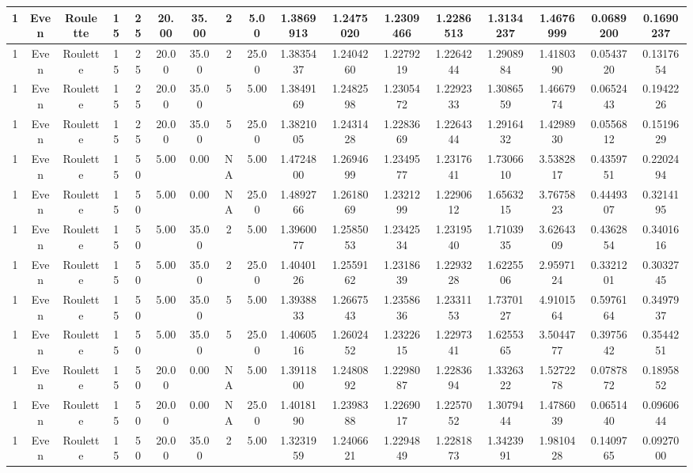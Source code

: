 \begin{longtable}{ | c | c | c | c | c | c | c | c | c | c | c | c | c | c | c | c | c | }
	\hline
	1	&	Even	&	Roulette	&	15	&	25	&	20.00	&	35.00	&	2	&	5.00	&	1.3869913	&	1.2475020	&	1.2309466	&	1.2286513	&	1.3134237	&	1.4676999	&	0.0689200	&	0.1690237 \\
	\hline
	1	&	Even	&	Roulette	&	15	&	25	&	20.00	&	35.00	&	2	&	25.00	&	1.3835437	&	1.2404260	&	1.2279219	&	1.2264244	&	1.2908984	&	1.4180390	&	0.0543720	&	0.1317654 \\
	\hline
	1	&	Even	&	Roulette	&	15	&	25	&	20.00	&	35.00	&	5	&	5.00	&	1.3849169	&	1.2482598	&	1.2305472	&	1.2292333	&	1.3086559	&	1.4667974	&	0.0652443	&	0.1942226 \\
	\hline
	1	&	Even	&	Roulette	&	15	&	25	&	20.00	&	35.00	&	5	&	25.00	&	1.3821005	&	1.2431428	&	1.2283669	&	1.2264344	&	1.2916432	&	1.4298930	&	0.0556812	&	0.1519629 \\
	\hline
	1	&	Even	&	Roulette	&	15	&	50	&	5.00	&	0.00	&	NA	&	5.00	&	1.4724800	&	1.2694699	&	1.2349577	&	1.2317641	&	1.7306610	&	3.5382817	&	0.4359751	&	0.2202494 \\
	\hline
	1	&	Even	&	Roulette	&	15	&	50	&	5.00	&	0.00	&	NA	&	25.00	&	1.4892766	&	1.2618069	&	1.2321299	&	1.2290612	&	1.6563215	&	3.7675823	&	0.4449307	&	0.3214195 \\
	\hline
	1	&	Even	&	Roulette	&	15	&	50	&	5.00	&	35.00	&	2	&	5.00	&	1.3960077	&	1.2585053	&	1.2342534	&	1.2319540	&	1.7103935	&	3.6264309	&	0.4362854	&	0.3401616 \\
	\hline
	1	&	Even	&	Roulette	&	15	&	50	&	5.00	&	35.00	&	2	&	25.00	&	1.4040126	&	1.2559162	&	1.2318639	&	1.2293228	&	1.6225506	&	2.9597124	&	0.3321201	&	0.3032745 \\
	\hline
	1	&	Even	&	Roulette	&	15	&	50	&	5.00	&	35.00	&	5	&	5.00	&	1.3938833	&	1.2667543	&	1.2358636	&	1.2331153	&	1.7370127	&	4.9101564	&	0.5976164	&	0.3497937 \\
	\hline
	1	&	Even	&	Roulette	&	15	&	50	&	5.00	&	35.00	&	5	&	25.00	&	1.4060516	&	1.2602452	&	1.2322615	&	1.2297341	&	1.6255365	&	3.5044777	&	0.3975642	&	0.3544251 \\
	\hline
	1	&	Even	&	Roulette	&	15	&	50	&	20.00	&	0.00	&	NA	&	5.00	&	1.3911800	&	1.2480892	&	1.2298087	&	1.2283694	&	1.3326322	&	1.5272278	&	0.0787872	&	0.1895852 \\
	\hline
	1	&	Even	&	Roulette	&	15	&	50	&	20.00	&	0.00	&	NA	&	25.00	&	1.4018190	&	1.2398388	&	1.2269017	&	1.2257052	&	1.3079444	&	1.4786039	&	0.0651440	&	0.0960644 \\
	\hline
	1	&	Even	&	Roulette	&	15	&	50	&	20.00	&	35.00	&	2	&	5.00	&	1.3231959	&	1.2406621	&	1.2294849	&	1.2281873	&	1.3423991	&	1.9810428	&	0.1409765	&	0.0927000 \\

\end{longtable}
